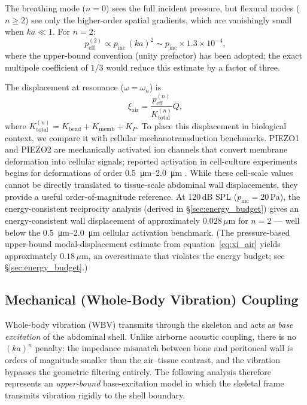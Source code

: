 The breathing mode ($n = 0$) sees the full incident pressure, but flexural
modes ($n \geq 2$) see only the higher-order spatial gradients, which are
vanishingly small when $ka \ll 1$.  For $n = 2$:
\begin{equation}\label{eq:peff2}
  p_\mathrm{eff}^{(2)} \propto p_\mathrm{inc} \, (ka)^2
  \sim p_\mathrm{inc} \times 1.3 \times 10^{-4},
\end{equation}
where the upper-bound convention (unity prefactor) has been adopted; the
exact multipole coefficient of $1/3$ would reduce this estimate by a factor
of three.

The displacement at resonance ($\omega = \omega_n$) is
\begin{equation}\label{eq:xi_air}
  \xi_\mathrm{air} = \frac{p_\mathrm{eff}^{(n)}}{K_\mathrm{total}^{(n)}} Q,
\end{equation}
where $K_\mathrm{total}^{(n)} = K_\mathrm{bend} + K_\mathrm{memb} + K_P$.
To place this displacement in biological context, we compare it with
cellular mechanotransduction benchmarks.  PIEZO1 and PIEZO2 are mechanically activated
ion channels that convert membrane deformation into cellular signals; reported
activation in cell-culture experiments begins for deformations of order
\SIrange{0.5}{2.0}{\micro\metre} \cite{coste2010piezo1}.  While these
cell-scale values cannot be directly translated to tissue-scale abdominal
wall displacements, they provide a useful order-of-magnitude reference.
At 120\,dB SPL ($p_\mathrm{inc} = 20$\,Pa), the energy-consistent reciprocity
analysis (derived in \S\ref{sec:energy_budget}) gives
an energy-consistent wall displacement of approximately
$0.028$\,$\mu$m for $n = 2$ --- well below the
\SIrange{0.5}{2.0}{\micro\metre} cellular activation benchmark.  (The pressure-based upper-bound
modal-displacement estimate from equation~\eqref{eq:xi_air} yields
approximately $0.18$\,$\mu$m, an overestimate
that violates the energy budget; see \S\ref{sec:energy_budget}.)


\subsection{Mechanical (Whole-Body Vibration) Coupling}\label{sec:wbv}

Whole-body vibration (WBV) transmits through the skeleton and acts as
\emph{base excitation} of the abdominal shell.  Unlike airborne acoustic
coupling, there is no $(ka)^n$ penalty: the impedance mismatch between bone
and peritoneal wall is orders of magnitude smaller than the air--tissue
contrast, and the vibration bypasses the geometric filtering entirely.  The
following analysis therefore represents an \emph{upper-bound} base-excitation
model in which the skeletal frame transmits vibration rigidly to the shell
boundary.

